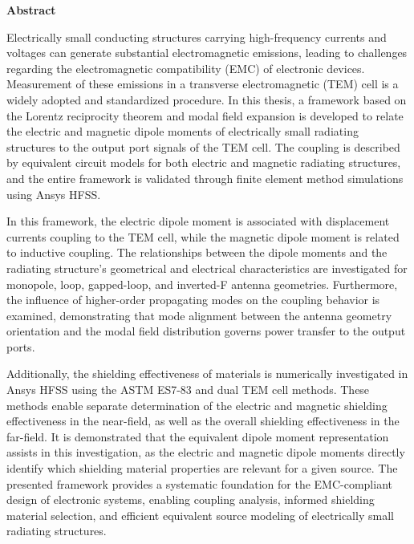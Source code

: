 \documentclass[11pt]{article}
\numberwithin{equation}{section}
\numberwithin{figure}{section}
\numberwithin{table}{section}
\begin{document}
\vspace*{2.2 cm}
{\Large
	\noindent
	{\bf Abstract}} \\
\vspace*{0.3 cm}

Electrically small conducting structures carrying high-frequency currents and voltages can generate substantial electromagnetic emissions, leading to challenges regarding the electromagnetic compatibility (EMC) of electronic devices. Measurement of these emissions in a transverse electromagnetic (TEM) cell is a widely adopted and standardized procedure. In this thesis, a framework based on the Lorentz reciprocity theorem and modal field expansion is developed to relate the electric and magnetic dipole moments of electrically small radiating structures to the output port signals of the TEM cell. The coupling is described by equivalent circuit models for both electric and magnetic radiating structures, and the entire framework is validated through finite element method simulations using Ansys HFSS.

In this framework, the electric dipole moment is associated with displacement currents coupling to the TEM cell, while the magnetic dipole moment is related to inductive coupling. The relationships between the dipole moments and the radiating structure's geometrical and electrical characteristics are investigated for monopole, loop, gapped-loop, and inverted-F antenna geometries. Furthermore, the influence of higher-order propagating modes on the coupling behavior is examined, demonstrating that mode alignment between the antenna geometry orientation and the modal field distribution governs power transfer to the output ports.

Additionally, the shielding effectiveness of materials is numerically investigated in Ansys HFSS using the ASTM ES7-83 and dual TEM cell methods. These methods enable separate determination of the electric and magnetic shielding effectiveness in the near-field, as well as the overall shielding effectiveness in the far-field. It is demonstrated that the equivalent dipole moment representation assists in this investigation, as the electric and magnetic dipole moments directly identify which shielding material properties are relevant for a given source. The presented framework provides a systematic foundation for the EMC-compliant design of electronic systems, enabling coupling analysis, informed shielding material selection, and efficient equivalent source modeling of electrically small radiating structures.
\end{document}
